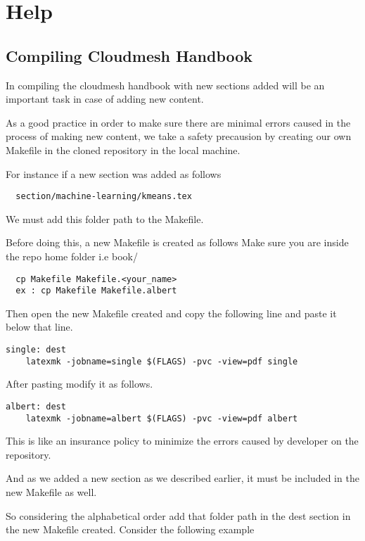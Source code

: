 \chapter{Help}

\section{Compiling Cloudmesh Handbook}\label{s:help-compile-handbook}

In compiling the cloudmesh handbook with new sections added will be an
important task in case of adding new content.

As a good practice in order to make sure there are minimal errors caused
in the process of making new content, we take a safety precausion by creating
our own Makefile in the cloned repository in the local machine.

For instance if a new section was added as follows

\begin{lstlisting}
  section/machine-learning/kmeans.tex 
\end{lstlisting}

We must add this folder path to the Makefile.

Before doing this, a new Makefile is created as follows
Make sure you are inside the repo home folder i.e book/
\begin{lstlisting}
  cp Makefile Makefile.<your_name>
  ex : cp Makefile Makefile.albert
\end{lstlisting}

Then open the new Makefile created and copy the following line
and paste it below that line. 

\begin{lstlisting}
single: dest 
	latexmk -jobname=single $(FLAGS) -pvc -view=pdf single
\end{lstlisting}  

After pasting modify it as follows.

\begin{lstlisting}
albert: dest 
	latexmk -jobname=albert $(FLAGS) -pvc -view=pdf albert
\end{lstlisting}  

This is like an insurance policy to minimize the errors caused
by developer on the repository.

And as we added a new section as we described earlier, it must be
included in the new Makefile as well.

So considering the alphabetical order add that folder path in the
dest section in the new Makefile created. Consider the following
example

